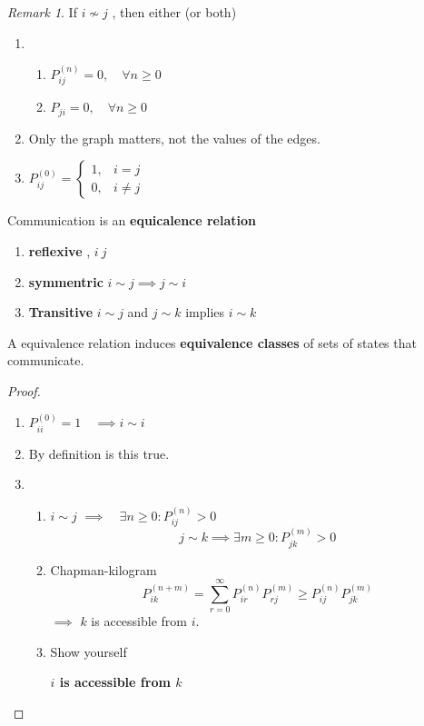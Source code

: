 \documentclass{article}
\theoremstyle{remark}
\newtheorem*{remark}{Remark}
\newcommand{\newpara}
  {
  \vskip 0.4cm
  }
\begin{document}
\begin{remark}
  If $ i \not \sim  j$ , then either (or both) 
  \begin{enumerate}[label=(\alph*)]
    \item
    \begin{enumerate}[label=(\roman*)]
    \item $P^{(n)}_{ij} = 0, \quad  \forall n\ge0 $
    \item  $P_{ji} = 0, \quad  \forall n\ge0 $
    \end{enumerate}
  \item Only the graph matters, not the values of the edges.
  \item $P^{(0)}_{ij} = \begin{cases}
    1,  &  i = j \\
    0,  &  i\neq j
  \end{cases}$

  \end{enumerate}
\end{remark}

\begin{theorem}
  Communication is an \textbf{equicalence relation} 
  \begin{enumerate}[label=(\roman*)]
    \item \textbf{reflexive} , $i ~ j$
    \item  \textbf{symmentric }  $i \sim  j \implies  j \sim i$
    \item \textbf{Transitive}  $i \sim j$ and $ j \sim k$ implies $i \sim k$
  \end{enumerate}
  A equivalence relation induces \textbf{equivalence classes} of sets of states that communicate.
\end{theorem}

\begin{proof}
  \begin{enumerate}[label=(\roman*)]
    \item $P ^{\left( 0 \right)} _{ii} = 1 \quad  \implies  i \sim i   $ 
    \item By definition is this true.
    \item 
      \begin{enumerate}[label=(\alph*)]
        \item $ i \sim j$ $\implies  \quad  \exists n\ge 0: P ^{(n)} _{ij} > 0 $ \[
        j \sim  k \implies  \exists m\ge 0 : P^{(m)} _{jk} > 0
        \] 
      \item Chapman-kilogram \[
      P^{(n+m)} _{ik} = \sum_{r=0}^{\infty} P^{(n)}_{ir} P^{(m)}_{rj} \ge P^{(n)}_{ij} P^{(m)}_{jk}
      \] 
      $\implies $ $k$ is accessible from $i$.
    \item Show yourself 
      
      \newpara
      \textbf{$i$ is accessible from $k$} 

      \end{enumerate}
  \end{enumerate}
\end{proof}
\end{document}

